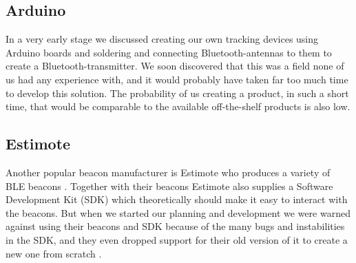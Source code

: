 \documentclass[../Main/thesis.tex]{subfiles}
\begin{document}
\subsection{Arduino}
In a very early stage we discussed creating our own tracking devices using Arduino boards and soldering and connecting Bluetooth-antennas to them to create a Bluetooth-transmitter.
We soon discovered that this was a field none of us had any experience with, and it would probably have taken far too much time to develop this solution.
The probability of us creating a product, in such a short time, that would be comparable to the available off-the-shelf products is also low.

\subsection{Estimote}
Another popular beacon manufacturer is Estimote who produces a variety of BLE beacons \citep{EstimoteInc.2018}.
Together with their beacons Estimote also supplies a Software Development Kit (SDK) which theoretically should make it easy to interact with the beacons.
But when we started our planning and development we were warned against using their beacons and SDK because of the many bugs and instabilities in the SDK, and they even dropped support for their old version of it to create a new one from scratch \citep{Saetre2017}.


\onlyinsubfile{}
\onlyinsubfile{}
\end{document}
